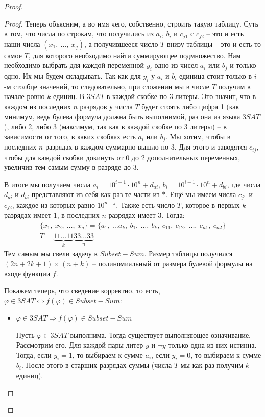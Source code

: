 \documentclass[a4paper,12pt]{article}
\begin{document}
\begin{proof}
\begin{proof}
        Теперь объясним, а во имя чего, собственно, строить такую таблицу. Суть в том, что числа по строкам, что получились из $a_i$, $b_i$ и $c_{j1}$ с $c_{j2}$ -- это и есть наши числа $(x_1,\ \ldots,\ x_q)$, а получившееся число $T$ внизу таблицы -- это и есть то самое $T$, для которого необходимо найти суммирующее подмножество. Нам необходимо выбрать для каждой переменной $y_i$ одно из чисел $a_i$ или $b_j$ и только одно. Их мы будем складывать. Так как для $y_i$ у $a_i$ и $b_i$ единица стоит только в $i$-м столбце значений, то следовательно, при сложении мы в числе $T$ получим в начале ровно $k$ единиц. В $3SAT$ в каждой скобке по 3 литеры. Это значит, что в каждом из последних $n$ разрядов у числа $T$ будет стоять либо цифра 1 (как минимум, ведь булева формула должна быть выполнимой, раз она из языка $3SAT$), либо 2, либо 3 (максимум, так как в каждой скобке по 3 литеры) -- в зависимости от того, в каких скобках есть $a_i$ или $b_j$. Мы хотим, чтобы в последних $n$ разрядах в каждом суммарно вышло по 3. Для этого и заводятся $c_{ij}$, чтобы для каждой скобки докинуть от 0 до 2 дополнительных переменных, увеличив тем самым сумму в разряде до 3.
        
        В итоге мы получаем числа $a_i = 10^{i - 1} \cdot 10^n + d_{ai}$, $b_i = 10^{i - 1} \cdot 10^n + d_{bi}$, где числа $d_{ai}$ и $d_{bi}$ представляют из себя как раз те части из $\ast$. Ещё мы имеем числа $c_{j1}$ и $c_{j2}$, каждое из которых равно $10^{n - j}$. Также есть число $T$, которое в первых $k$ разрядах имеет 1, в последних $n$ разрядах имеет 3. Тогда:
        \begin{gather*}
            \{x_1,\ x_2,\ \ldots,\ x_q\} = \big\{a_1,\ \ldots a_k,\ b_1,\ \ldots,\ b_k,\ c_{11},\ c_{12},\ \ldots,\ c_{n1},\ c_{n2}\big\}\\
            T = \underbrace{11\ldots11}_{k}\underbrace{33\ldots33}_{n}
        \end{gather*}
        Тем самым мы свели задачу к $Subset-Sum$. Размер таблицы получился $(2n + 2k + 1)\times (n + k)$ -- полиномиальный от размера булевой формулы на входе функции $f$.
        
        Покажем теперь, что сведение корректно, то есть, $\varphi \in 3SAT \Longleftrightarrow f(\varphi) \in Subset-Sum$:
        \begin{itemize}
            \item $\varphi \in 3SAT \Longrightarrow f(\varphi) \in Subset-Sum$
            
            Пусть $\varphi \in 3SAT$ выполнима. Тогда существует выполняющее означивание. Рассмотрим его. Для каждой пары литер $y$ и $\neg y$ только одна из них истинна. Тогда, если $y_i = 1$, то выбираем к сумме $a_i$, если $y_i = 0$, то выбираем к сумме $b_i$. После этого в старших разрядах суммы (числа $T$ мы как раз получим $k$ единиц).
            

\end{itemize}
\end{proof}
\end{proof}
\end{document}

